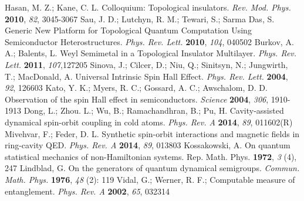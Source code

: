 \documentclass[atoms,article,submit,moreauthors,dvi2pdf,12pt,a4paper]{mdpi}
\begin{document}
\begin{thebibliography}{999}
Hasan, M. Z.; Kane, C. L. Colloquium: Topological insulators. {\em Rev. Mod. Phys.} {\bf 2010}, {\em 82}, 3045-3067
Sau, J. D.; Lutchyn, R. M.; Tewari, S.; Sarma Das, S. Generic New Platform for Topological Quantum Computation Using Semiconductor Heterostructures. {\em Phys. Rev. Lett.} {\bf 2010}, {\em 104}, 040502
Burkov, A. A.; Balents, L. Weyl Semimetal in a Topological Insulator Multilayer. {\em Phys. Rev. Lett.} {\bf 2011}, {\em 107},127205
Sinova, J.; Cilcer, D.; Niu, Q.; Sinitsyn, N.; Jungwirth, T.; MacDonald, A. Universal Intrinsic Spin Hall Effect. {\em Phys. Rev. Lett.} {\bf 2004}, {\em 92}, 126603
Kato, Y. K.; Myers, R. C.; Gossard, A. C.; Awschalom, D. D. Observation of the spin Hall effect in semiconductors. {\em Science} {\bf 2004}, {\em 306}, 1910-1913
Dong, L.; Zhou. L.; Wu, B.; Ramachandhran, B.; Pu, H. Cavity-assisted dynamical spin-orbit coupling in cold atoms. {\em Phys. Rev. A} {\bf 2014}, {\em 89}, 011602(R)
Mivehvar, F.; Feder, D. L. Synthetic spin-orbit interactions and magnetic fields in ring-cavity QED. {\em Phys. Rev. A} {\bf 2014}, {\em 89}, 013803
Kossakowski, A. On quantum statistical mechanics of non-Hamiltonian systems. {Rep. Math. Phys.} {\bf 1972}, {\em 3} (4), 247
Lindblad, G. On the generators of quantum dynamical semigroups. {\em Commun. Math. Phys.} {\bf 1976}, {\em 48} (2): 119
Vidal, G.; Werner, R. F.; Computable measure of entanglement. {\em Phys. Rev. A} {\bf 2002}, {\em 65}, 032314
\end{thebibliography}
\end{document}
